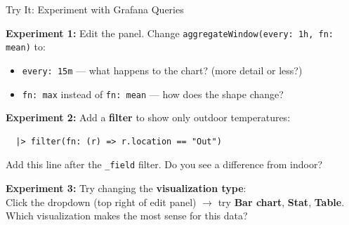 \documentclass[aspectratio=169,11pt]{beamer}
\begin{document}
\begin{frame}[fragile]{ Try It: Experiment with Grafana Queries}

    \vspace{0.15cm}
    \textbf{Experiment 1:} Edit the panel. Change \texttt{aggregateWindow(every: 1h, fn: mean)} to:
    \begin{itemize}
        \item \texttt{every: 15m} --- what happens to the chart? (more detail or less?)
        \item \texttt{fn: max} instead of \texttt{fn: mean} --- how does the shape change?
    \end{itemize}

    \vspace{0.15cm}
    \textbf{Experiment 2:} Add a \textbf{filter} to show only outdoor temperatures:
\begin{lstlisting}
  |> filter(fn: (r) => r.location == "Out")
\end{lstlisting}
    {\small Add this line after the \texttt{\_field} filter. Do you see a difference from indoor?}

    \vspace{0.15cm}
    \textbf{Experiment 3:} Try changing the \textbf{visualization type}:\\
    Click the dropdown (top right of edit panel) $\rightarrow$ try \textbf{Bar chart}, \textbf{Stat}, \textbf{Table}.\\
    {\small Which visualization makes the most sense for this data?}

    \vspace{0.1cm}
\end{frame}
\end{document}
